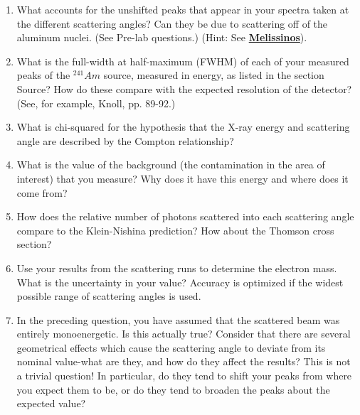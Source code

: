 \documentclass{../lab}
\begin{document}
\begin{enumerate}
    \item What accounts for the unshifted peaks that appear in your spectra taken at the different scattering angles? Can they be due to scattering off of the aluminum nuclei. (See Pre-lab questions.) (Hint: See \href{https://drive.google.com/file/d/1aIipjSwVCA50zE-flRiX0fXz9UKq3lZS/view?usp=drive_link}{\textbf{Melissinos}}).

    \item What is the full-width at half-maximum (FWHM) of each of your measured peaks of the $^{241}Am$ source, measured in energy, as listed in the section Source? How do these compare with the expected resolution of the detector? (See, for example, Knoll, pp. 89-92.)
    
    \item What is chi-squared for the hypothesis that the X-ray energy and scattering angle are described by the Compton relationship?
    
    \item What is the value of the background (the contamination in the area of interest) that you measure? Why does it have this energy and where does it come from?
    
    \item How does the relative number of photons scattered into each scattering angle compare to the Klein-Nishina prediction? How about the Thomson cross section?
    
    \item Use your results from the scattering runs to determine the electron mass. What is the uncertainty in your value? Accuracy is optimized if the widest possible range of scattering angles is used.
    
    \item In the preceding question, you have assumed that the scattered beam was entirely monoenergetic. Is this actually true? Consider that there are several geometrical effects which cause the scattering angle to deviate from its nominal value-what are they, and how do they affect the results? This is not a trivial question! In particular, do they tend to shift your peaks from where you expect them to be, or do they tend to broaden the peaks about the expected value?
    

\end{enumerate}
\end{document}
